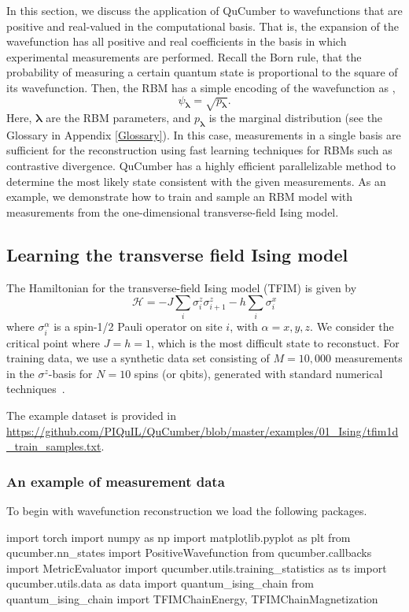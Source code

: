 \documentclass[submission, Phys]{SciPost}
\begin{document}
In this section, we discuss the application of QuCumber to wavefunctions that are positive and real-valued in the computational basis.
That is, the expansion of the wavefunction has all positive and real coefficients in the basis in which experimental
measurements are performed.
Recall the Born rule, that the probability of measuring a certain quantum state is proportional to the square of its wavefunction.  
Then, the RBM has a simple encoding of the wavefunction as \cite{torlai2018tomography},
\begin{equation}
\psi_{\bm{\lambda}}= \sqrt{p_{\bm{\lambda}}}. \label{wfpd}
\end{equation}  
Here, ${\bm \lambda}$ are the RBM parameters, and $p_{\bm{\lambda}}$ is the marginal distribution (see the Glossary in Appendix \ref{Glossary}).
In this case, measurements in a single basis are sufficient for the reconstruction using fast learning techniques for RBMs such as contrastive divergence.
QuCumber has a highly efficient parallelizable method to determine the most likely state consistent with the given measurements.
As an example, we demonstrate how to train and sample an RBM model with measurements from the one-dimensional transverse-field Ising model.

\subsection{Learning the transverse field Ising model}
\label{Sec:Training_TFIM}

The Hamiltonian for the transverse-field Ising model (TFIM) is given by
\begin{equation}
	\mathcal{H} = -J\sum_i \sigma^z_i \sigma^z_{i+1} - h \sum_i \sigma^x_i \label{TFIM}	
\end{equation}
where $\sigma^{\alpha}_i$ is a spin-1/2 Pauli operator on site $i$, with $\alpha=x,y,z$. We consider the critical point where $J=h=1$, which is the most difficult state to reconstuct.
For training data, we use a synthetic data set consisting of $M=10,000$ measurements in the $\sigma^z$-basis for $N=10$ spins (or qbits), generated with standard numerical techniques~\cite{itensor}.

The example dataset is provided in \url{https://github.com/PIQuIL/QuCumber/blob/master/examples/01_Ising/tfim1d_train_samples.txt}.

\subsubsection{An example of measurement data}
To begin with wavefunction reconstruction we load the following packages.
\begin{python}
import torch
import numpy as np
import matplotlib.pyplot as plt
from qucumber.nn_states import PositiveWavefunction
from qucumber.callbacks import MetricEvaluator
import qucumber.utils.training_statistics as ts
import qucumber.utils.data as data
import quantum_ising_chain
from quantum_ising_chain import TFIMChainEnergy, TFIMChainMagnetization
\end{python}
\end{document}
